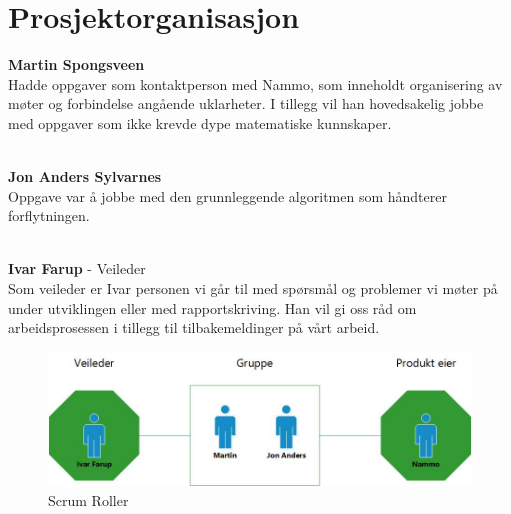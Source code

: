 \section{Prosjektorganisasjon}
\begin{description}
 \itme \textbf{Martin Spongsveen}\\ Hadde oppgaver som kontaktperson med Nammo, som inneholdt 
organisering av møter og forbindelse angående uklarheter. I tillegg vil han hovedsakelig jobbe med oppgaver som ikke krevde dype matematiske kunnskaper.\\ \\
\item \textbf{Jon Anders Sylvarnes}\\ Oppgave var å jobbe med den grunnleggende algoritmen som
håndterer forflytningen.\\ \\
 \item \textbf{Ivar Farup} - Veileder\\ Som veileder er Ivar personen vi går til med spørsmål og problemer vi 
møter på under utviklingen eller med rapportskriving. Han vil gi oss råd om arbeidsprosessen i tillegg til tilbakemeldinger på vårt arbeid.
\end{description}





\begin{figure}[h]
    \centering
    \includegraphics[width=\textwidth]{Scrumroller1}
    \caption{Scrum Roller}
    \label{fig:my_label}
\end{figure}




